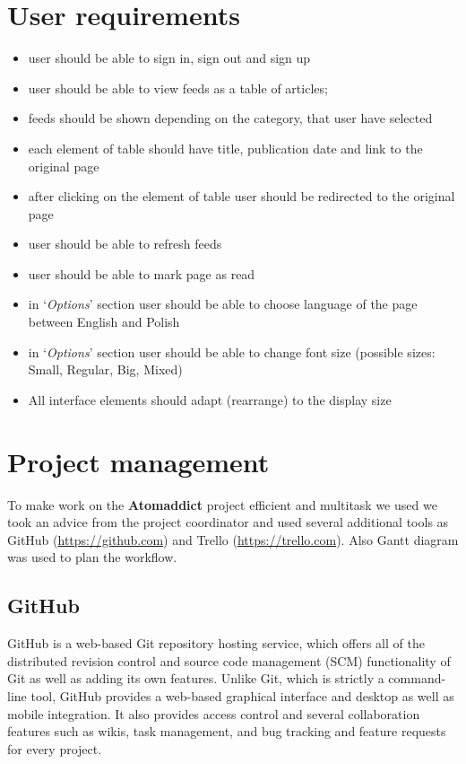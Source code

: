 \documentclass[12pt]{article}
\begin{document}
\section{User requirements}\label{user requirements}
\begin{itemize}
	\item user should be able to sign in, sign out and sign up
	\item user should be able to view feeds as a table of articles; 
	\item feeds should be shown depending on the category, that user have selected
	\item each element of table should have title, publication date and link to the original page
	\item after clicking on the element of table user should be redirected to the original page
	\item user should be able to refresh feeds
	\item user should be able to mark page as read
	\item in `\emph{Options}' section user should be able to choose language of the page between English and Polish
	\item in `\emph{Options}' section user should be able to change font size (possible sizes:  Small, Regular, Big, Mixed)
	\item All interface elements should adapt (rearrange) to the display size
\end{itemize}

\section{Project management}\label{project management}
To make work on the \textbf{Atomaddict} project efficient and multitask we used we took an advice from the project coordinator and used several additional tools as GitHub (\url{https://github.com}) and Trello (\url{https://trello.com}). Also Gantt diagram was used to plan the workflow.

\subsection{GitHub}
GitHub is a web-based Git repository hosting service, which offers all of the distributed revision control and source code management (SCM) functionality of Git as well as adding its own features. Unlike Git, which is strictly a command-line tool, GitHub provides a web-based graphical interface and desktop as well as mobile integration. It also provides access control and several collaboration features such as wikis, task management, and bug tracking and feature requests for every project.
\end{document}
